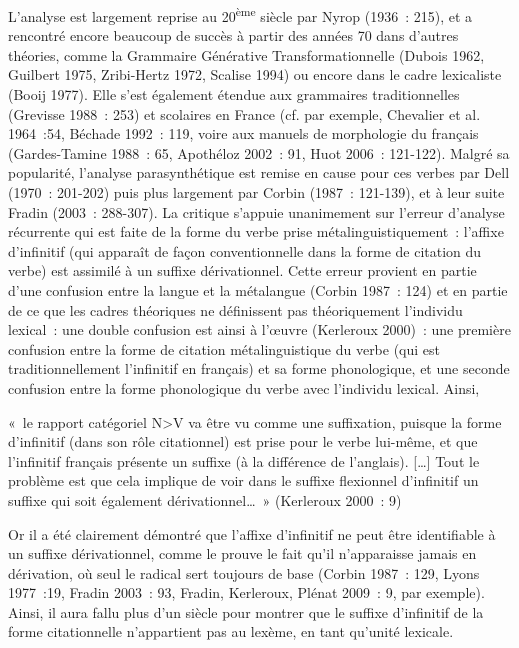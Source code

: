 \documentclass[output=paper]{langsci/langscibook}
\begin{document}
L'analyse est largement reprise au 20\textsuperscript{ème} siècle par
Nyrop (1936~: 215), et a rencontré encore beaucoup de succès à partir des
années 70 dans d'autres théories, comme la Grammaire Générative
Transformationnelle (Dubois 1962, Guilbert 1975, Zribi-Hertz 1972,
Scalise 1994) ou encore dans le cadre lexicaliste (Booij 1977). Elle
s'est également étendue aux grammaires traditionnelles (Grevisse 1988~:
253) et scolaires en France (cf. par exemple, Chevalier et al. 1964~:54,
Béchade 1992~: 119, voire aux manuels de morphologie du français
(Gardes-Tamine 1988~: 65, Apothéloz 2002~: 91, Huot 2006~: 121-122).
Malgré sa popularité, l'analyse parasynthétique est remise en cause pour
ces verbes par Dell (1970~: 201-202) puis plus largement par Corbin
(1987~: 121-139), et à leur suite Fradin (2003~: 288-307). La critique
s'appuie unanimement sur l'erreur d'analyse récurrente qui est faite de
la forme du verbe prise métalinguistiquement~: l'affixe d'infinitif (qui
apparaît de façon conventionnelle dans la forme de citation du verbe)
est assimilé à un suffixe dérivationnel. Cette erreur provient en partie
d'une confusion entre la langue et la métalangue (Corbin 1987~: 124) et
en partie de ce que les cadres théoriques ne définissent pas
théoriquement l'individu lexical~: une double confusion est ainsi à
l'œuvre (Kerleroux 2000)~: une première confusion entre la forme de
citation métalinguistique du verbe (qui est traditionnellement
l'infinitif en français) et sa forme phonologique, et une seconde
confusion entre la forme phonologique du verbe avec l'individu lexical.
Ainsi,

«~le rapport catégoriel N\textgreater{}V va être vu comme une
suffixation, puisque la forme d'infinitif (dans son rôle citationnel)
est prise pour le verbe lui-même, et que l'infinitif français présente
un suffixe (à la différence de l'anglais). {[}\ldots{}{]} Tout le
problème est que cela implique de voir dans le suffixe flexionnel
d'infinitif un suffixe qui soit également dérivationnel\ldots{}~»
(Kerleroux 2000~: 9)

Or il a été clairement démontré que l'affixe d'infinitif ne peut être
identifiable à un suffixe dérivationnel, comme le prouve le fait qu'il
n'apparaisse jamais en dérivation, où seul le radical sert toujours de
base (Corbin 1987~: 129, Lyons 1977~:19, Fradin 2003~: 93, Fradin,
Kerleroux, Plénat 2009~: 9, par exemple). Ainsi, il aura fallu plus d'un
siècle pour montrer que le suffixe d'infinitif de la forme citationnelle
n'appartient pas au lexème, en tant qu'unité lexicale.
\end{document}
